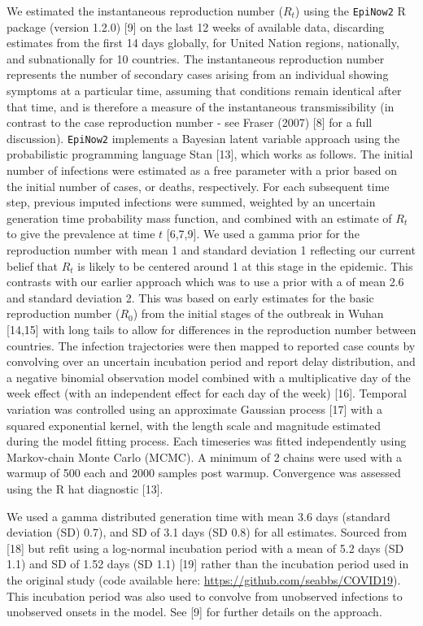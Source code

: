 \documentclass[
]{article}
\begin{document}
We estimated the instantaneous reproduction number (\(R_t\)) using the
\texttt{EpiNow2} R package (version 1.2.0) {[}9{]} on the last 12 weeks
of available data, discarding estimates from the first 14 days globally,
for United Nation regions, nationally, and subnationally for 10
countries. The instantaneous reproduction number represents the number
of secondary cases arising from an individual showing symptoms at a
particular time, assuming that conditions remain identical after that
time, and is therefore a measure of the instantaneous transmissibility
(in contrast to the case reproduction number - see Fraser (2007) {[}8{]}
for a full discussion). \texttt{EpiNow2} implements a Bayesian latent
variable approach using the probabilistic programming language Stan
{[}13{]}, which works as follows. The initial number of infections were
estimated as a free parameter with a prior based on the initial number
of cases, or deaths, respectively. For each subsequent time step,
previous imputed infections were summed, weighted by an uncertain
generation time probability mass function, and combined with an estimate
of \(R_t\) to give the prevalence at time \(t\) {[}6,7,9{]}. We used a
gamma prior for the reproduction number with mean 1 and standard
deviation 1 reflecting our current belief that \(R_t\) is likely to be
centered around 1 at this stage in the epidemic. This contrasts with our
earlier approach which was to use a prior with a of mean 2.6 and
standard deviation 2. This was based on early estimates for the basic
reproduction number (\(R_0\)) from the initial stages of the outbreak in
Wuhan {[}14,15{]} with long tails to allow for differences in the
reproduction number between countries. The infection trajectories were
then mapped to reported case counts by convolving over an uncertain
incubation period and report delay distribution, and a negative binomial
observation model combined with a multiplicative day of the week effect
(with an independent effect for each day of the week) {[}16{]}. Temporal
variation was controlled using an approximate Gaussian process {[}17{]}
with a squared exponential kernel, with the length scale and magnitude
estimated during the model fitting process. Each timeseries was fitted
independently using Markov-chain Monte Carlo (MCMC). A minimum of 2
chains were used with a warmup of 500 each and 2000 samples post warmup.
Convergence was assessed using the R hat diagnostic {[}13{]}.

We used a gamma distributed generation time with mean 3.6 days (standard
deviation (SD) 0.7), and SD of 3.1 days (SD 0.8) for all estimates.
Sourced from {[}18{]} but refit using a log-normal incubation period
with a mean of 5.2 days (SD 1.1) and SD of 1.52 days (SD 1.1) {[}19{]}
rather than the incubation period used in the original study (code
available here: \url{https://github.com/seabbs/COVID19}). This
incubation period was also used to convolve from unobserved infections
to unobserved onsets in the model. See {[}9{]} for further details on
the approach.
\end{document}
